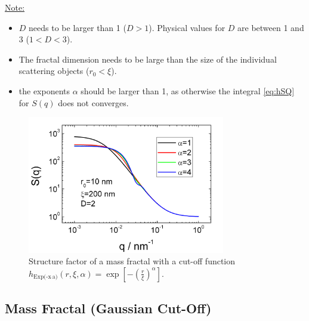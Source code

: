 \uline{Note:}
\begin{itemize}
\item $D$ needs to be larger than 1 ($D>1$). Physical values for $D$ are between 1 and 3 ($1<D<3$).
\item The fractal dimension needs to be large than the size of the individual scattering objects ($r_0 < \xi$).
\item the exponents $\alpha$ should be larger than 1, as otherwise the integral \ref{eq:hSQ} for $S(q)$ does not converges.
\end{itemize}

\begin{figure}[htb]
\begin{center}
\includegraphics[width=0.768\textwidth]{../images/structure_factor/MassFractals/SQExp(pow(x,a))CutOff.png}
\end{center}
\caption{Structure factor of a mass fractal with a cut-off function
$h_\text{Exp(-x$\hat{~}$a)}(r,\xi,\alpha) = \exp\left[-\left(\tfrac{r}{\xi}\right)^\alpha\right]$.}
\label{fig:SQExpxaCutOff}
\end{figure}


\clearpage
\subsection{Mass Fractal (Gaussian Cut-Off)}
~\\


